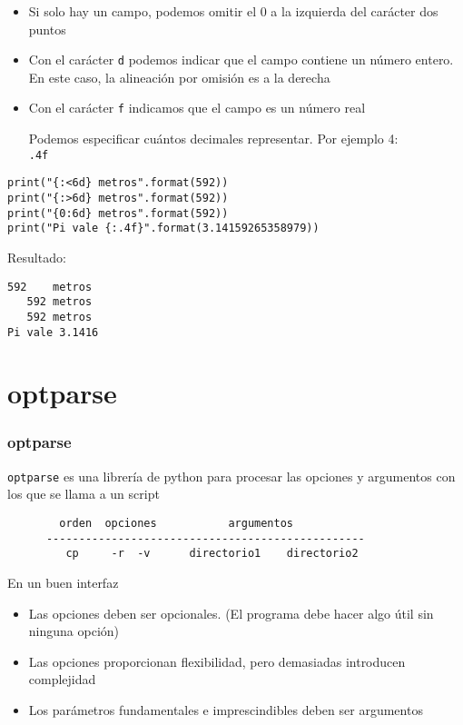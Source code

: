 \documentclass[ucs]{beamer}
\begin{document}
\begin{frame}[fragile]
\frametitle{}
\begin{itemize}
\item
Si solo hay un campo, podemos omitir el 0 a la izquierda del carácter dos puntos

\item
Con el carácter \verb|d| podemos indicar que el campo
contiene un número entero. En este caso, la alineación
por omisión es a la derecha

\item
Con el carácter \verb|f| indicamos que el campo es un 
número real

Podemos especificar cuántos decimales representar. Por 
ejemplo 4:
\verb|         .4f| 
\end{itemize}

  \begin{footnotesize}
  \begin{verbatim}
print("{:<6d} metros".format(592))
print("{:>6d} metros".format(592))
print("{0:6d} metros".format(592))
print("Pi vale {:.4f}".format(3.14159265358979))
  \end{verbatim}
  \end{footnotesize}
Resultado:

  \begin{footnotesize}
  \begin{verbatim}
592    metros
   592 metros
   592 metros
Pi vale 3.1416
  \end{verbatim}
  \end{footnotesize}

\end{frame}




\section{optparse}

\begin{frame}[fragile]
\frametitle{optparse}
\verb|optparse| es una librería de python para procesar las
opciones y argumentos con los que se llama a un script
  \begin{footnotesize}
  \begin{verbatim}
        orden  opciones           argumentos
      -------------------------------------------------
         cp     -r  -v      directorio1    directorio2
  \end{verbatim}
  \end{footnotesize}
En un buen interfaz
\begin{itemize}
\item
Las opciones deben ser opcionales. (El programa debe hacer
algo útil sin ninguna opción)
\item
Las opciones proporcionan flexibilidad, pero demasiadas
introducen complejidad
\item
Los parámetros fundamentales e imprescindibles deben ser
argumentos
\end{itemize}

\end{frame}
\end{document}
